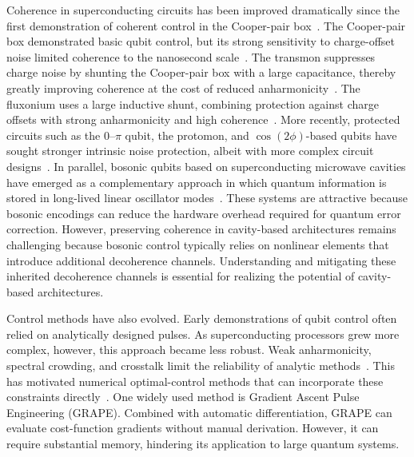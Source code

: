 Coherence in superconducting circuits has been improved dramatically since the first demonstration of coherent control in the Cooper-pair box~\cite{Nakamura1999}. The Cooper-pair box demonstrated basic qubit control, but its strong sensitivity to charge-offset noise limited coherence to the nanosecond scale~\cite{Nakamura2002,Astafiev2004}. The transmon suppresses charge noise by shunting the Cooper-pair box with a large capacitance, thereby greatly improving coherence at the cost of reduced anharmonicity~\cite{Koch2007,Schreier2008,Houck2008}. The fluxonium uses a large inductive shunt, combining protection against charge offsets with strong anharmonicity and high coherence~\cite{Manucharyan2009,Nguyen2019}. More recently, protected circuits such as the $0\text{--}\pi$ qubit, the protomon, and $\cos(2\phi)$-based qubits have sought stronger intrinsic noise protection, albeit with more complex circuit designs~\cite{Brooks2013,Gyenis2021,Kumar2024Protomon,Smith2020}. In parallel, bosonic qubits based on superconducting microwave cavities have emerged as a complementary approach in which quantum information is stored in long-lived linear oscillator modes~\cite{Cai2021,Copetudo2024,Paik2011,Reagor2013,Reagor2016,Milul2023,Romanenko2020,Joshi2021}. These systems are attractive because bosonic encodings can reduce the hardware overhead required for quantum error correction. However, preserving coherence in cavity-based architectures remains challenging because bosonic control typically relies on nonlinear elements that introduce additional decoherence channels. Understanding and mitigating these inherited decoherence channels is essential for realizing the potential of cavity-based architectures.

Control methods have also evolved. Early demonstrations of qubit control often relied on analytically designed pulses. As superconducting processors grew more complex, however, this approach became less robust. Weak anharmonicity, spectral crowding, and crosstalk limit the reliability of analytic methods~\cite{Motzoi2009DRAG,Dumas2024}. This has motivated numerical optimal-control methods that can incorporate these constraints directly~\cite{Brif2010Control,Khaneja2005,deFouquieres2011GRAPE}. One widely used method is Gradient Ascent Pulse Engineering (GRAPE). Combined with automatic differentiation, GRAPE can evaluate cost-function gradients without manual derivation. However, it can require substantial memory, hindering its application to large quantum systems.

